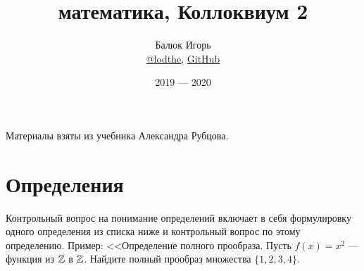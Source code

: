 \documentclass[a4paper]{article}
\title{\HugeДискретная математика, Коллоквиум 2}
\author{
	Балюк Игорь \\
	\href{https://teleg.run/lodthe}{@lodthe},
    \href{https://github.com/LoDThe/hse-tex}{GitHub} \\
}
\date{2019 --- 2020}
\begin{document}
    \maketitle

    Материалы взяты из учебника Александра Рубцова.

    \tableofcontents

    \newpage

    \section{Определения}

    Контрольный вопрос на понимание определений включает в себя формулировку одного определения из списка ниже и контрольный вопрос по этому определению. Пример: <<Определение полного прообраза. Пусть $f(x) = x^2$ --- функция из $\mathbb{Z}$ в $\mathbb{Z}$. Найдите полный прообраз множества $\{1, 2, 3, 4\}$.
\end{document}
